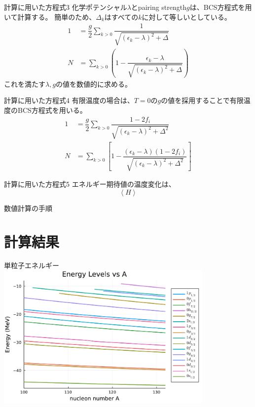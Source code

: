 \documentclass[aspectratio=169, 12pt, dvipdfmx]{beamer}
\begin{document}
\begin{frame}{計算に用いた方程式3}
  化学ポテンシャル$\lambda$とpairing strength$g$は、BCS方程式を用いて計算する。
  簡単のため、$\Delta_k$はすべての$k$に対して等しいとしている。
  \begin{align}
    1  &=  \dfrac{g}{2}\sum_{k>0}\dfrac{1}{\sqrt{(\epsilon_k - \lambda)^2+\Delta}}\\
    N       &=  \sum_{k>0}\left(1 - \dfrac{\epsilon_k - \lambda}{\sqrt{(\epsilon_k - \lambda)^2+\Delta}}\right)
  \end{align}
  これを満たす$\lambda,g$の値を数値的に求める。
\end{frame}

\begin{frame}{計算に用いた方程式4}
  有限温度の場合は、$T=0$の$g$の値を採用することで有限温度のBCS方程式を用いる。\cite{goodman1981finite}
  \begin{align}
    1  &=  \dfrac{g}{2}\sum_{k>0}\dfrac{1-2f_i}{\sqrt{(\epsilon_k - \lambda)^2+\Delta^2}}\\
    N       &=  \sum_{k>0}\left[1-\dfrac{(\epsilon_k - \lambda)(1-2f_i)}{\sqrt{(\epsilon_k - \lambda)^2+\Delta^2}}\right] 
  \end{align}
\end{frame}

\begin{frame}{計算に用いた方程式5}
  エネルギー期待値の温度変化は、
  \begin{equation}
    \left\langle H\right\rangle 
  \end{equation}
\end{frame}

\begin{frame}{数値計算の手順}
  
\end{frame}

\section{計算結果}
\begin{frame}{単粒子エネルギー}
  \centering
  \includegraphics[width=0.8\textwidth]{Energy_vs_A.pdf}
\end{frame}
\end{document}

